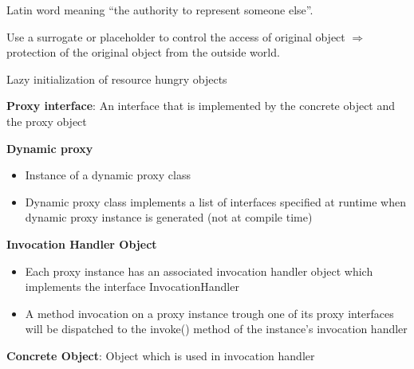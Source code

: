 \begin{defnbox}\nospacing
  \begin{defn}[Proxy]
     Latin word meaning ``the authority to represent someone else''.
  \end{defn}
\end{defnbox}
\begin{figure}[H]	
  \centering
    \resizebox{\linewidth}{!}{\tikzset{font=\Huge}}
\end{figure}
\begin{intentbox}[Intents]
  \begin{itemizenosep}
      \item 
      Use a surrogate or placeholder to control the access of original object
      $\Rightarrow$ protection of the original object from the outside world.
      \item Lazy initialization of resource hungry objects
  \end{itemizenosep}
\end{intentbox}
\begin{partbox}[Participants]
  \begin{itemizenosep}
\item \textbf{Proxy interface}:
An interface that is implemented by the concrete object and the proxy object
\item \textbf{Dynamic proxy}
\begin{itemize}
    \item 
Instance of a dynamic proxy class
\item
Dynamic proxy class implements a list of interfaces specified at runtime when
dynamic proxy instance is generated (not at compile time)
\end{itemize}
\item \textbf{Invocation Handler Object}
\begin{itemize}
    \item 
Each proxy instance has an associated invocation handler object which
implements the interface InvocationHandler
\item A method invocation on a proxy instance trough one of its proxy interfaces will
be dispatched to the invoke() method of the instance’s invocation handler
\end{itemize}
\item \textbf{Concrete Object}:
Object which is used in invocation handler
  \end{itemizenosep}
\end{partbox}

